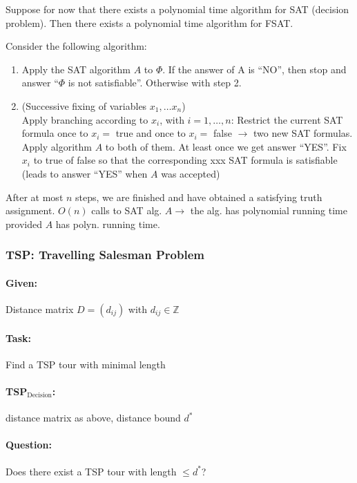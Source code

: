 \documentclass[11pt]{article}
\theoremstyle{definition}
\theoremstyle{definition}
\begin{document}
Suppose for now that there exists a polynomial time algorithm for SAT (decision problem). Then there exists a polynomial time algorithm for FSAT.

Consider the following algorithm:
\begin{enumerate}
\item Apply the SAT algorithm $ A $ to $ \Phi $. If the answer of A is ``NO'', then stop and answer ``$\Phi $ is not satisfiable''. Otherwise with step 2.
\item (Successive fixing of variables $ x_1, \dots x_n $) \\ Apply branching according to $ x_i $, with  $ i  = 1, \dots, n $: Restrict the current SAT formula once to $ x_ i = $ true and once to $ x_i = $ false $ \rightarrow $ two new SAT formulas. Apply algorithm $ A $ to both of them. At least once we get answer ``YES''. Fix $ x_i $ to true of false so that the corresponding xxx SAT formula is satisfiable (leads to answer ``YES'' when $ A $ was accepted)
\end{enumerate}

After at most $ n $ steps, we are finished and have obtained a satisfying truth assignment. $ O(n) $ calls to SAT alg. $ A \rightarrow $ the alg. has polynomial running time provided $ A $ has polyn. running time.

\subsubsection{TSP: Travelling Salesman Problem}

\paragraph{Given:} Distance matrix $ D = (d_{ij}) $ with $ d_{ij} \in \mathbb{Z} $

\paragraph{Task:} Find a TSP tour with minimal length

\paragraph{TSP$_\text{Decision}$:} distance matrix as above, distance bound $ d^\ast $
\paragraph{Question: } Does there exist a TSP tour with length $ \leq d^\ast $?
\end{document}
